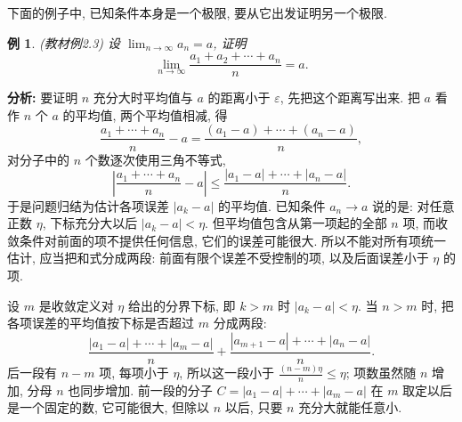 \documentclass[UTF8,openany]{ctexbook}
\theoremstyle{chinesetextbook}
\newtheorem{example}{例}[section]
\begin{document}
下面的例子中, 已知条件本身是一个极限, 要从它出发证明另一个极限.
\begin{example}\label{ex:2-3}
\textnormal{(教材例2.3)} 设 $\displaystyle\lim_{n\to\infty}a_n=a$, 证明
\[
\lim_{n\to\infty}\frac{a_1+a_2+\cdots+a_n}n=a.
\]
\end{example}
\par\indent\textbf{分析:} 要证明 $n$ 充分大时平均值与 $a$ 的距离小于 $\varepsilon$, 先把这个距离写出来. 把 $a$ 看作 $n$ 个 $a$ 的平均值, 两个平均值相减, 得
\[
\frac{a_1+\cdots+a_n}n-a=\frac{(a_1-a)+\cdots+(a_n-a)}n,
\]
对分子中的 $n$ 个数逐次使用三角不等式,
\[
\left|\frac{a_1+\cdots+a_n}n-a\right|\le\frac{|a_1-a|+\cdots+|a_n-a|}n.
\]
于是问题归结为估计各项误差 $|a_k-a|$ 的平均值. 已知条件 $a_n\to a$ 说的是: 对任意正数 $\eta$, 下标充分大以后 $|a_k-a|<\eta$. 但平均值包含从第一项起的全部 $n$ 项, 而收敛条件对前面的项不提供任何信息, 它们的误差可能很大. 所以不能对所有项统一估计, 应当把和式分成两段: 前面有限个误差不受控制的项, 以及后面误差小于 $\eta$ 的项.

设 $m$ 是收敛定义对 $\eta$ 给出的分界下标, 即 $k>m$ 时 $|a_k-a|<\eta$. 当 $n>m$ 时, 把各项误差的平均值按下标是否超过 $m$ 分成两段:
\[
\frac{|a_1-a|+\cdots+|a_m-a|}n+\frac{|a_{m+1}-a|+\cdots+|a_n-a|}n.
\]
后一段有 $n-m$ 项, 每项小于 $\eta$, 所以这一段小于 $\displaystyle\frac{(n-m)\eta}n\le\eta$; 项数虽然随 $n$ 增加, 分母 $n$ 也同步增加. 前一段的分子 $C=|a_1-a|+\cdots+|a_m-a|$ 在 $m$ 取定以后是一个固定的数, 它可能很大, 但除以 $n$ 以后, 只要 $n$ 充分大就能任意小.
\end{document}
